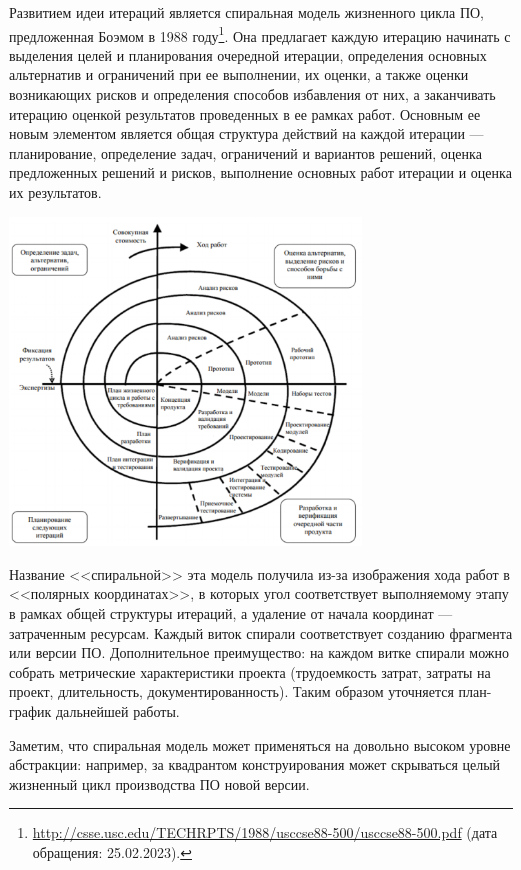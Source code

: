 \documentclass{../../text-style}
\begin{document}
Развитием идеи итераций является спиральная модель жизненного цикла ПО, предложенная Боэмом в 1988 году\footnote{\url{http://csse.usc.edu/TECHRPTS/1988/usccse88-500/usccse88-500.pdf} (дата обращения: 25.02.2023).}. Она предлагает каждую итерацию начинать с выделения целей и планирования очередной итерации, определения основных альтернатив и ограничений при ее выполнении, их оценки, а также оценки возникающих рисков и определения способов избавления от них, а заканчивать итерацию оценкой результатов проведенных в ее рамках работ. Основным ее новым элементом является общая структура действий на каждой итерации --- планирование, определение задач, ограничений и вариантов решений, оценка предложенных решений и рисков, выполнение основных работ итерации и оценка их результатов.

\begin{center}
    \includegraphics[width=0.7\textwidth]{spiralModel.png}
\end{center}

Название <<спиральной>> эта модель получила из-за изображения хода работ в <<полярных координатах>>, в которых угол соответствует выполняемому этапу в рамках общей структуры итераций, а удаление от начала координат --- затраченным ресурсам. Каждый виток спирали соответствует созданию фрагмента или версии ПО. Дополнительное преимущество: на каждом витке спирали можно собрать метрические характеристики проекта (трудоемкость затрат, затраты на проект, длительность, документированность). Таким образом уточняется план-график дальнейшей работы.

Заметим, что спиральная модель может применяться на довольно высоком уровне абстракции: например, за квадрантом конструирования может скрываться целый жизненный цикл производства ПО новой версии.
\end{document}
